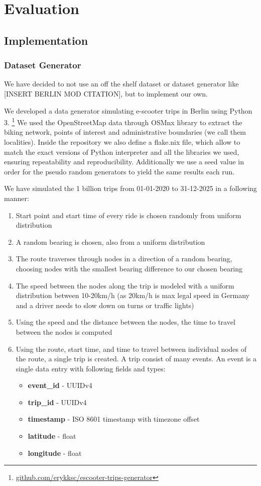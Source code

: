 \section{Evaluation}
\label{cha:evaluation}

\subsection{Implementation}
\label{sec:implementation}

\subsubsection{Dataset Generator}
We have decided to not use an off the shelf dataset or dataset generator like [INSERT BERLIN MOD CITATION], but to implement our own.

We developed a data generator simulating e-scooter trips in Berlin using Python 3. \footnote{\url{github.com/erykksc/escooter-trips-generator}}
We used the OpenStreetMap data through OSMnx library to extract the biking network, points of interest and administrative boundaries (we call them localities).
Inside the repository we also define a flake.nix file, which allow to match the exact versions of Python interpreter and all the libraries we used, ensuring repeatability and reproducibility.
Additionally we use a seed value in order for the pseudo random generators to yield the same results each run.


We have simulated the 1 billion trips from 01-01-2020 to 31-12-2025 in a following manner:
\begin{enumerate}
\item Start point and start time of every ride is chosen randomly from uniform distribution
\item A random bearing is chosen, also from a uniform distribution
\item The route traverses through nodes in a direction of a random bearing, choosing nodes with the smallest bearing difference to our chosen bearing
\item The speed between the nodes along the trip is modeled with a uniform distribution between 10-20km/h (as 20km/h is max legal speed in Germany and a driver needs to slow down on turns or traffic lights)
\item Using the speed and the distance between the nodes, the time to travel between the nodes is computed
\item Using the route, start time, and time to travel between individual nodes of the route, a single trip is created.
	A trip consist of many events. 
	An event is a single data entry with following fields and types:
	\begin{itemize}
		\item \textbf{event\_id} - UUIDv4
		\item \textbf{trip\_id} - UUIDv4
		\item \textbf{timestamp} - ISO 8601 timestamp with timezone offset
		\item \textbf{latitude} - float
		\item \textbf{longitude} - float
	\end{itemize}
\end{enumerate}

